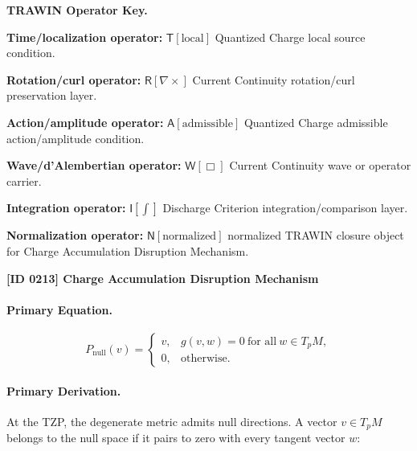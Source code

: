 \par\vspace{0.45\baselineskip}
\noindent\begin{minipage}[t]{\linewidth}
\begingroup
\small
\raggedright
\textbf{TRAWIN Operator Key.}\par
\noindent\textbf{Time/localization operator:} $\mathsf{T}\!\left[\mathrm{local}\right]$ Quantized Charge local source condition.\par
\noindent\textbf{Rotation/curl operator:} $\mathsf{R}\!\left[\nabla\times\right]$ Current Continuity rotation/curl preservation layer.\par
\noindent\textbf{Action/amplitude operator:} $\mathsf{A}\!\left[\mathrm{admissible}\right]$ Quantized Charge admissible action/amplitude condition.\par
\noindent\textbf{Wave/d'Alembertian operator:} $\mathsf{W}\!\left[\Box\right]$ Current Continuity wave or operator carrier.\par
\noindent\textbf{Integration operator:} $\mathsf{I}\!\left[\int\right]$ Discharge Criterion integration/comparison layer.\par
\noindent\textbf{Normalization operator:} $\mathsf{N}\!\left[\mathrm{normalized}\right]$ normalized TRAWIN closure object for Charge Accumulation Disruption Mechanism.\par
\endgroup
\end{minipage}

\clearpage
\noindent\textbf{[ID 0213] Charge Accumulation Disruption Mechanism}\par
\vspace{0.35em}
\paragraph{Primary Equation.}
\begin{equation}
P_{\mathrm{null}}(v)
=
\begin{cases}
v, & g(v,w)=0\ \text{for all}\ w\in T_pM,\\
0, & \text{otherwise}.
\end{cases}
\end{equation}

\paragraph{Primary Derivation.}
At the TZP, the degenerate metric admits null directions.  
A vector $v\in T_pM$ belongs to the null space if it pairs to zero with every tangent vector $w$:

